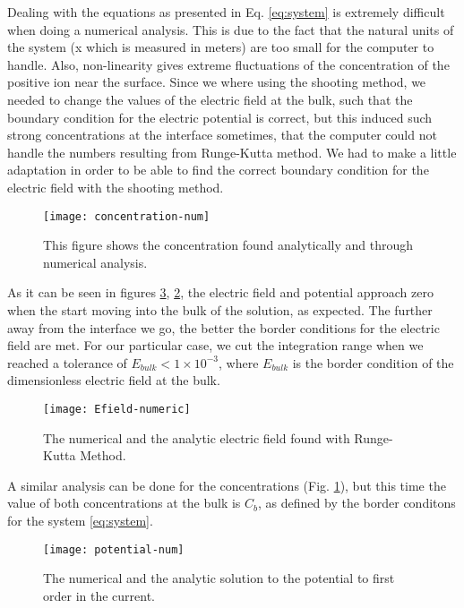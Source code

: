 Dealing with the equations as presented in Eq. \ref{eq:system} is extremely difficult when doing a numerical analysis. This is due to the fact that the natural units of the system (x which is measured in meters) are too small for the computer to handle. Also, non-linearity gives extreme fluctuations of the concentration of the positive ion near the surface. Since we where using the shooting method, we needed to change the values of the electric field at the bulk, such that the boundary condition for the electric potential is correct, but this induced such strong concentrations at the interface sometimes, that the computer could not handle the numbers resulting from Runge-Kutta method. We had to make a little adaptation in order to be able to find the correct boundary condition for the electric field with the shooting method. 

\newpage
\begin{figure}[h!]
 \centering
  \texttt{[image: concentration-num]}
 \caption{This figure shows the concentration found analytically and through numerical analysis.}
 \label{fig:numerical_c}
\end{figure}


As it can be seen in figures  \ref{fig:numerical-phi},  \ref{fig:numerical-E}, the electric field and potential approach zero when the start moving into the bulk of the solution, as expected. The further away from the interface we go, the better the border conditions for the electric field are met. For our particular case, we cut the integration range when we reached a tolerance of $ E_{bulk} < 1\times 10^{-3}$, where $E_{bulk}$ is the border condition of the dimensionless electric field at the bulk. 

\begin{figure}[h!]
 \centering
\texttt{[image: Efield-numeric]}
 \caption{The numerical and the analytic electric field found with Runge-Kutta Method.}
 \label{fig:numerical-E}
\end{figure}


A similar analysis can be done for the concentrations (Fig.  \ref{fig:numerical_c}), but this time the value of both concentrations at the bulk is $C_b$, as defined by the border conditons for the system \ref{eq:system}.


\begin{figure}[h!]
 \centering
\texttt{[image: potential-num]}
 \caption{The numerical and the analytic solution to the potential to first order in the current.}
 \label{fig:numerical-phi}
\end{figure}

